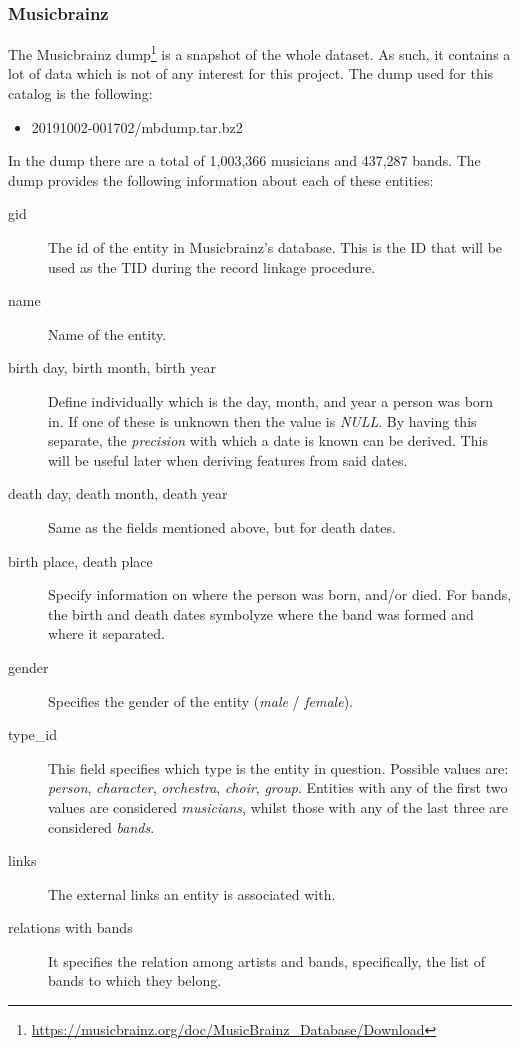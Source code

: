 \documentclass[epsfig,a4paper,11pt,titlepage,twoside,openany]{book}
\newcommand{\footurl}[1]{\footnote{\url{#1}}}
\begin{document}
\subsubsection{Musicbrainz}
\label{sec:shape-musicbrainz}

The Musicbrainz dump\footurl{https://musicbrainz.org/doc/MusicBrainz_Database/Download} is a snapshot of the whole dataset. As such, it contains a lot of data which is not of any interest for this project. The dump used for this catalog is the following:

\begin{itemize}
    \item 20191002-001702/mbdump.tar.bz2
\end{itemize}

In the dump there are a total of 1,003,366 musicians and 437,287 bands. The dump provides the following information about each of these entities:

\begin{description}
\item[gid] The id of the entity in Musicbrainz's database. This is the ID that will be used as the TID during the record linkage procedure. 

\item[name] Name of the entity.

\item[birth day, birth month, birth year] Define individually which is the day, month, and year a person was born in. If one of these is unknown then the value is \textit{NULL}. By having this separate, the \textit{precision} with which a date is known can be derived. This will be useful later when deriving features from said dates. 

\item[death day, death month, death year] Same as the fields mentioned above, but for death dates.

\item[birth place, death place] Specify information on where the person was born, and/or died. For bands, the birth and death dates symbolyze where the band was formed and where it separated.

\item[gender] Specifies the gender of the entity (\textit{male} / \textit{female}).

\item[type\_id] This field specifies which type is the entity in question. Possible values are: \textit{person}, \textit{character}, \textit{orchestra}, \textit{choir}, \textit{group}. Entities with any of the first two values are considered \textit{musicians}, whilst those with any of the last three are considered \textit{bands}.

\item[links] The external links an entity is associated with.

\item[relations with bands] It specifies the relation among artists and bands, specifically, the list of bands to which they belong. 
\end{description}
\end{document}
